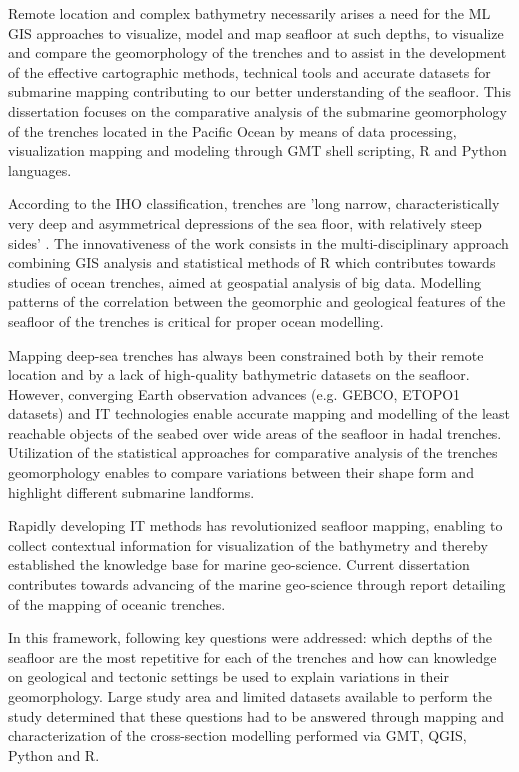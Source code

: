 \documentclass[11pt,a4paper]{report}
\begin{document}
Remote location and complex bathymetry necessarily arises a need for the \ac{ML} \ac{GIS} approaches to visualize, model and map seafloor at such depths, to visualize and compare the geomorphology of the trenches and to assist in the development of the effective cartographic methods, technical tools and accurate datasets for submarine mapping contributing to our better understanding of the seafloor. This dissertation focuses on the comparative analysis of the submarine geomorphology of the trenches located in the Pacific Ocean by means of data processing,  visualization mapping and modeling through \ac{GMT} shell scripting, R and Python languages. 

According to the \ac{IHO} classification, trenches are 'long narrow, characteristically very deep and asymmetrical depressions of the sea floor, with relatively steep sides' \cite{IHO2008}. The innovativeness of the work consists in the multi-disciplinary approach combining \ac{GIS} analysis and statistical methods of R which contributes towards studies of ocean trenches, aimed at geospatial analysis of big data. Modelling patterns of the correlation between the geomorphic and geological features of the seafloor of the trenches is critical for proper ocean modelling. 

Mapping deep-sea trenches has always been constrained both by their remote location and by a lack of high-quality bathymetric datasets on the seafloor. However, converging Earth observation advances (e.g. \ac{GEBCO}, \ac{ETOPO1} datasets) and \ac{IT} technologies enable accurate mapping and modelling of the least reachable objects of the seabed over wide areas of the seafloor in hadal trenches. Utilization of the statistical approaches for comparative analysis of the trenches geomorphology enables to compare variations between their shape form and highlight different submarine landforms. 

Rapidly developing \ac{IT} methods has revolutionized seafloor mapping, enabling to collect contextual information for visualization of the bathymetry and thereby established the knowledge base for marine geo-science. Current dissertation contributes towards advancing of the marine geo-science through report detailing of the mapping of oceanic trenches.  

In this framework, following key questions were addressed: which depths of the seafloor are the most repetitive for each of the trenches and how can knowledge on geological and tectonic settings be used to explain variations in their geomorphology. Large study area and limited datasets available to perform the study determined that these questions had to be answered through mapping and characterization of the cross-section modelling performed via \ac{GMT}, QGIS, Python and R. 
\end{document}
